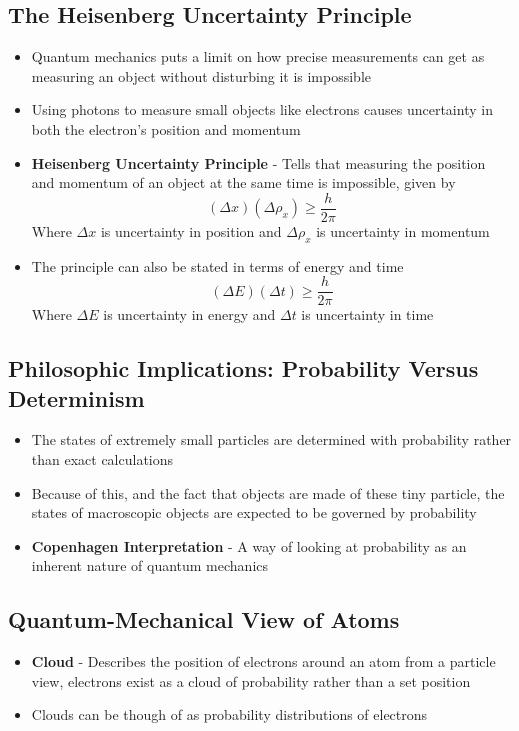 \subsection{The Heisenberg Uncertainty Principle}
\begin{itemize}
    \item Quantum mechanics puts a limit on how precise measurements can get as measuring an object without disturbing it is impossible
    \item Using photons to measure small objects like electrons causes uncertainty in both the electron's position and momentum
    \item \textbf{Heisenberg Uncertainty Principle} - Tells that measuring the position and momentum of an object at the same time is impossible, given by \[(\Delta x)(\Delta\rho_x)\geq\frac{h}{2\pi}\] Where \(\Delta x\) is uncertainty in position and \(\Delta\rho_x\) is uncertainty in momentum
    \item The principle can also be stated in terms of energy and time \[(\Delta E)(\Delta t)\geq\frac{h}{2\pi}\] Where \(\Delta E\) is uncertainty in energy and \(\Delta t\) is uncertainty in time
\end{itemize}

\subsection{Philosophic Implications: Probability Versus Determinism}
\begin{itemize}
    \item The states of extremely small particles are determined with probability rather than exact calculations
    \item Because of this, and the fact that objects are made of these tiny particle, the states of macroscopic objects are expected to be governed by probability
    \item \textbf{Copenhagen Interpretation} - A way of looking at probability as an inherent nature of quantum mechanics
\end{itemize}

\subsection{Quantum-Mechanical View of Atoms}
\begin{itemize}
    \item \textbf{Cloud} - Describes the position of electrons around an atom from a particle view, electrons exist as a cloud of probability rather than a set position
    \item Clouds can be though of as probability distributions of electrons
\end{itemize}

